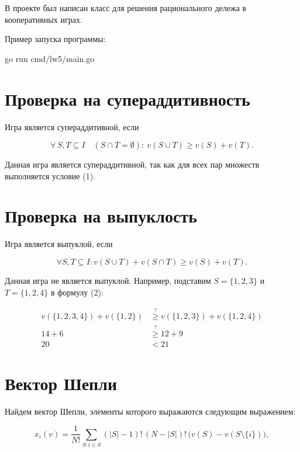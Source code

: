 
В проекте был написан класс для решения рационального дележа в кооперативных играх.

Пример запуска программы:

\begin{codelisting}[language=Bash]
    go run cmd/lw5/main.go
\end{codelisting}

\section{Проверка на супераддитивность}

Игра является супераддитивной, если

\begin{equation}
\forall\, S,T \subseteq I \quad (S \cap T = \emptyset) \colon \ v(S \cup T) \geq v(S) + v(T).
\end{equation}

Данная игра является супераддитивной, так как для всех пар множеств выполняется условие (1).

\section{Проверка на выпуклость}

Игра является выпуклой, если

\begin{equation}
\forall S, T \subseteq I \colon v(S \cup T) + v(S \cap T) \geq v(S) + v(T).
\end{equation}

Данная игра не является выпуклой. Например, подставим $S = \{1, 2, 3\}$ и $T = \{1, 2, 4\}$ в формулу (2):

\begin{align*}
  v(\{1, 2, 3, 4\}) + v(\{1, 2\}) &\overset{?}{\geq} v(\{1, 2, 3\}) + v(\{1, 2, 4\}) \\
  14 + 6 &\overset{?}{\geq} 12 + 9 \\
  20 &< 21
\end{align*}

\section{Вектор Шепли}

Найдем вектор Шепли, элементы которого выражаются следующим выражением:

\begin{equation}
x_i(v) = \frac{1}{N!} \sum_{S \colon i \in S} (|S| - 1)! \, (N - |S|)! \, \big(v(S) - v(S \setminus \{i\})\big),
\end{equation}

